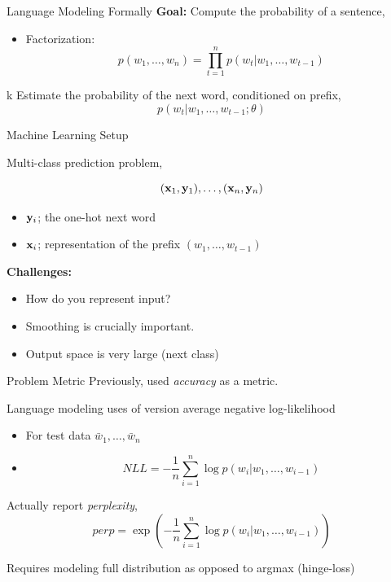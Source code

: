 \documentclass{beamer}
\begin{document}
{

}


\begin{frame}{Language Modeling Formally}
  \textbf{Goal:} Compute the probability of a sentence,

  \begin{itemize}
  \item Factorization:
    \[ p(w_1, \ldots, w_n) = \prod_{t=1}^n p(w_t | w_1, \ldots, w_{t-1}) \]
  \end{itemize}
k
  Estimate the probability of the next word, conditioned on prefix,
  \[ p(w_t | w_1, \ldots, w_{t-1};\theta)\]
\end{frame}

\begin{frame}{Machine Learning Setup}

  Multi-class prediction problem, 

  \[ (\mathbf{x}_1, \mathbf{y}_1), \ldots, (\mathbf{x}_n, \mathbf{y}_n) \]
  \begin{itemize}
  \item $\mathbf{y}_i$; the one-hot next word
  \item $\mathbf{x}_i$; representation of the prefix $(w_1, \ldots, w_{t-1})$
  \end{itemize}
  \pause
  \textbf{Challenges:}
  \begin{itemize}
  \item How do you represent input?
  \item Smoothing is crucially important.
  \item Output space is very large (next class)
  \end{itemize}
\end{frame}

\begin{frame}{Problem Metric}
  Previously, used \textit{accuracy} as a metric.
  
  \air 

  Language modeling uses of version  average negative
  log-likelihood 
  \begin{itemize}
    \item For test data $\bar{w}_1, \ldots, \bar{w}_n$
    \item \[NLL = -\frac{1}{n}\sum_{i=1}^n \log p(w_i | w_1, \ldots,w_{i-1})\]
  \end{itemize}


  Actually report \textit{perplexity},
  \[ perp = \exp(-\frac{1}{n}\sum_{i=1}^n \log p(w_i | w_1, \ldots,w_{i-1})) \]

  Requires modeling full distribution as opposed to argmax (hinge-loss)
\end{frame}
\end{document}
